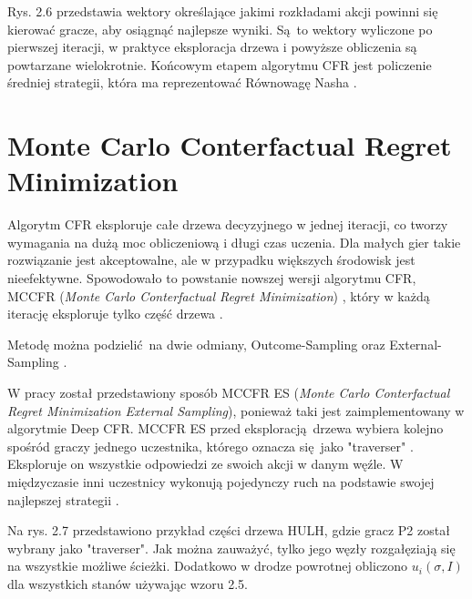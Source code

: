 \documentclass[12pt,oneside,a4paper]{report}
\begin{document}
Rys. 2.6 przedstawia wektory określające jakimi rozkładami akcji powinni się kierować gracze, aby
osiągnąć najlepsze wyniki. Są to wektory wyliczone po pierwszej iteracji, w praktyce eksploracja
drzewa i powyższe obliczenia są powtarzane wielokrotnie. Końcowym etapem algorytmu CFR jest
policzenie średniej strategii, która ma reprezentować Równowagę Nasha \cite{CFR}.





\section{Monte Carlo Conterfactual Regret Minimization}

Algorytm CFR eksploruje całe drzewa decyzyjnego w jednej iteracji, co tworzy wymagania na
dużą moc obliczeniową i długi czas uczenia. Dla małych gier takie rozwiązanie jest akceptowalne, ale w przypadku 
większych środowisk jest nieefektywne.
Spowodowało to powstanie nowszej wersji algorytmu CFR, MCCFR (\emph{Monte Carlo Conterfactual Regret
Minimization}) , 
który w każdą iterację eksploruje tylko część drzewa \cite{mccfr}.

Metodę można podzielić na dwie odmiany, Outcome-Sampling oraz External-Sampling \cite{mccfr}.

W pracy został przedstawiony sposób MCCFR ES (\emph{Monte Carlo Conterfactual Regret
Minimization External Sampling}), ponieważ taki jest zaimplementowany w algorytmie
Deep CFR.
MCCFR ES przed eksploracją drzewa wybiera kolejno spośród graczy jednego uczestnika, którego 
oznacza
się jako "traverser" \cite{DCFR}.
Eksploruje on wszystkie odpowiedzi ze swoich akcji w danym węźle. W międzyczasie inni
uczestnicy wykonują pojedynczy ruch na podstawie swojej najlepszej strategii \cite{mccfr}.  


Na rys. 2.7 przedstawiono przykład części drzewa HULH, 
gdzie gracz P2
został wybrany jako "traverser". 
Jak można zauważyć, tylko jego węzły rozgałęziają się na wszystkie możliwe ścieżki. 
Dodatkowo w drodze powrotnej obliczono $u_{i} (\sigma, I)$ dla wszystkich
stanów używając wzoru 
2.5.
\end{document}
